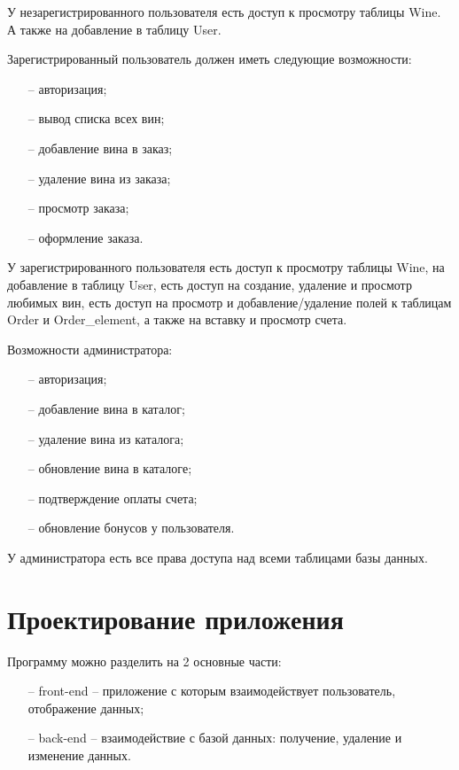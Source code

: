У незарегистрированного пользователя есть доступ к просмотру таблицы Wine. А также на добавление в таблицу User.

Зарегистрированный пользователь должен иметь следующие возможности:
\begin{itemize}
    \item[--] авторизация;
    \item[--] вывод списка всех вин;
    \item[--] добавление вина в заказ;
    \item[--] удаление вина из заказа;
    \item[--] просмотр заказа;
    \item[--] оформление заказа.
\end{itemize}

У зарегистрированного пользователя есть доступ к просмотру таблицы Wine, на добавление в таблицу User, есть доступ на создание, удаление и просмотр любимых вин, есть доступ на просмотр и добавление/удаление полей к таблицам Order и Order\_element, а также на вставку и просмотр счета.

Возможности администратора:
\begin{itemize}
    \item[--] авторизация;
    \item[--] добавление вина в каталог; 
    \item[--] удаление вина из каталога; 
    \item[--] обновление вина в каталоге;
    \item[--] подтверждение оплаты счета;
    \item[--] обновление бонусов у пользователя.
\end{itemize}

У администратора есть все права доступа над всеми таблицами базы данных.

\section{Проектирование приложения}

Программу можно разделить на 2 основные части:
\begin{itemize}
    \item[--] front-end – приложение с которым взаимодействует пользователь,
отображение данных;
\item[--] back-end – взаимодействие с базой данных: получение, удаление и
изменение данных.
\end{itemize}

